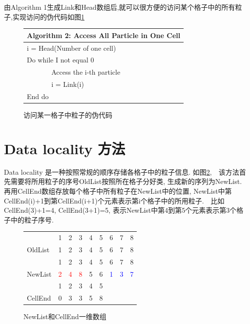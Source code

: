 \documentclass[a4paper]{article}
\begin{document}
由Algorithm 1生成Link和Head数组后,就可以很方便的访问某个格子中的所有粒子,实现访问的伪代码如图\ref{Alg2}

\begin{figure}[!htb]
\centering
\begin{tabular}{lll}
\hline
\multicolumn{3}{|l|}{Algorithm 2:  Access All Particle in One Cell} \\
\hline
\multicolumn{3}{|l|}{i = Head(Number of one cell)} \\
\multicolumn{3}{|l|}{Do while I not equal 0} \\
\multicolumn{1}{|l}{} &  & \multicolumn{1}{l|}{Access the i-th particle} \\
\multicolumn{1}{|l}{} &  & \multicolumn{1}{l|}{i = Link(i)} \\
\multicolumn{3}{|l|}{End do} \\
\hline
\end{tabular}
\caption{\label{Alg2}访问某一格子中粒子的伪代码}
\end{figure}


\section{Data locality 方法}

Data locality 是一种按照常规的顺序存储各格子中的粒子信息. 如图\ref{Alg3},　该方法首先需要将所用粒子的序号OldList按照所在格子分好类, 生成新的序列为NewList. 再用CellEnd数组存放每个格子中所有粒子在NewList中的位置, NewList中第CellEnd(i)+1到第CellEnd(i+1)个元素表示第i个格子中的所用粒子.　比如CellEnd(3)+1=4, CellEnd(3+1)=5, 表示NewList中第4到第5个元素表示第3个格子中的粒子序号.

\begin{figure}[!htb]
\centering
\begin{tabular}{lllllllll}
 & 1 & 2 & 3 & 4 & 5 & 6 & 7 & 8 \\
\cline{2-9}
\multicolumn{1}{l|}{OldList} & \multicolumn{1}{l|}{1} & \multicolumn{1}{l|}{2} & \multicolumn{1}{l|}{3} & \multicolumn{1}{l|}{4} & \multicolumn{1}{l|}{5} & \multicolumn{1}{l|}{6} & \multicolumn{1}{l|}{7} & \multicolumn{1}{l|}{8} \\
\cline{2-9}
 & 1 & 2 & 3 & 4 & 5 & 6 & 7 & 8 \\
\cline{2-9}
\multicolumn{1}{l|}{NewList} & \multicolumn{1}{l|}{\textcolor{red}{2}} & \multicolumn{1}{l|}{\textcolor{red}{4}} & \multicolumn{1}{l|}{\textcolor{red}{8}} & \multicolumn{1}{l|}{5} & \multicolumn{1}{l|}{6} & \multicolumn{1}{l|}{\textcolor{blue}{1}} & \multicolumn{1}{l|}{\textcolor{blue}{3}} & \multicolumn{1}{l|}{\textcolor{blue}{7}} \\
\cline{2-9}
 & 1 & 2 & 3 & 4 & 5 &  &  &  \\
\cline{2-6}
\multicolumn{1}{l|}{CellEnd} & \multicolumn{1}{l|}{0} & \multicolumn{1}{l|}{3} & \multicolumn{1}{l|}{3} & \multicolumn{1}{l|}{5} & \multicolumn{1}{l|}{8} &  &  &  \\
\cline{2-6}
\end{tabular}
\caption{\label{Alg3}NewList和CellEnd一维数组}
\end{figure}
\end{document}
